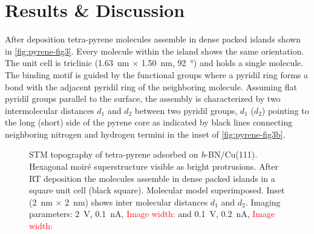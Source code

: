 \section{Results \& Discussion}
After deposition tetra-pyrene molecules assemble in dense packed islands shown in \autoref{fig:pyrene-fig3}. Every molecule within the island shows the same orientation. The unit cell is triclinic (\SI{1.63}{\nano \meter} $\times$ \SI{1.50}{\nano \meter}, \SI{92}{\degree}) and holds a single molecule. The binding motif is guided by the functional groups where a pyridil ring forms a bond with the adjacent pyridil ring of the neighboring molecule. Assuming flat pyridil groups parallel to the surface, the assembly is characterized by two intermolecular distances $d_1$ and $d_2$ between two pyridil groups, $d_1$ ($d_2$) pointing to the long (short) side of the pyrene core as indicated by black lines connecting neighboring nitrogen and hydrogen termini in the inset of \autoref{fig:pyrene-fig3b}. 

\begin{figure}[] \centering
	\caption{STM topography of tetra-pyrene adsorbed on \textit{h}-BN/Cu(111).  Hexagonal moir\'e superstructure visible as bright protrusions.  After RT deposition the molecules assemble in dense packed islands in a square unit cell (black square). Molecular model superimposed. Inset (\SI{2}{\nano \meter} $\times$ \SI{2}{\nano \meter}) shows inter molecular distances $d_1$ and $d_2$. 
		Imaging parameters: 
		 \SI{2}{\volt}, \SI{0.1}{\nano \ampere}, \textcolor{red}{Image width:} and 
		 \SI{0.1}{\volt}, \SI{0.2}{\nano \ampere}, \textcolor{red}{Image width:}
	}
	\label{fig:pyrene-fig3}
\end{figure}

